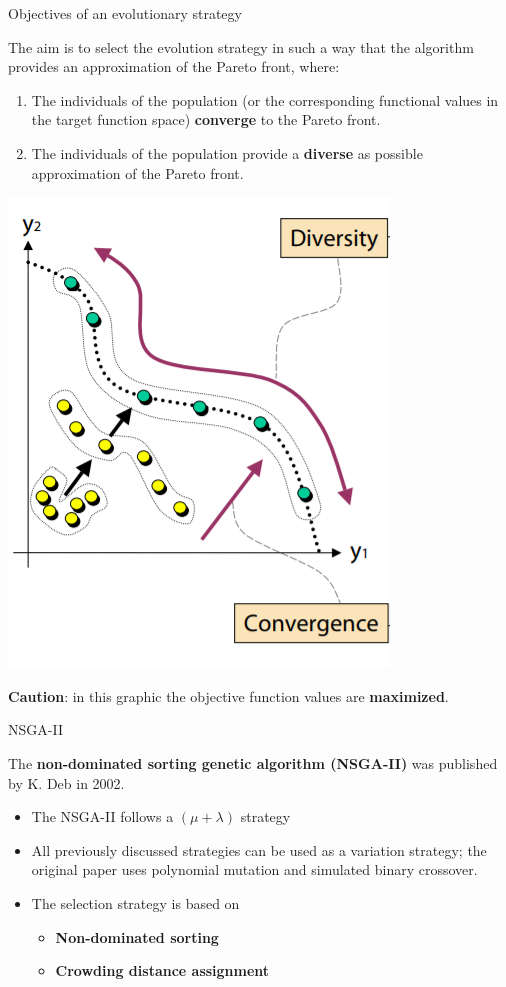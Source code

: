 \begin{frame}{Objectives of an evolutionary strategy}

The aim is to select the evolution strategy in such a way that the algorithm provides an approximation of the Pareto front, where:

\begin{enumerate}
\item The individuals of the population (or the corresponding functional values in the target function space) \textbf{converge} to the Pareto front.
\item The individuals of the population provide a \textbf{diverse} as possible approximation of the Pareto front.
\end{enumerate}

\vspace*{-0.3cm}

\begin{center}
\includegraphics[width = 0.2\linewidth]{images/EMO_goals.png}
\end{center}

\vspace*{-0.5cm}

\begin{footnotesize}
\textbf{Caution}: in this graphic the objective function values are \textbf{maximized}. %
\end{footnotesize}

\end{frame}

\begin{frame}{NSGA-II}

The \textbf{non-dominated sorting genetic algorithm (NSGA-II)} was published by K. Deb in 2002.

\begin{itemize}
\item The NSGA-II follows a $(\mu + \lambda)$ strategy
\item All previously discussed strategies can be used as a variation strategy; the original paper uses polynomial mutation and simulated binary crossover.
\item The selection strategy is based on
\begin{itemize}
\item \textbf{Non-dominated sorting}
\item \textbf{Crowding distance assignment}
\end{itemize}
\end{itemize}

\end{frame}

